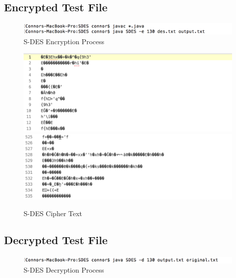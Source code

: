 \documentclass[]{article}
\begin{document}
\subsection*{Encrypted Test File}

\begin{figure}[H]
	\includegraphics[width=\textwidth]{sdes_encrypt.png}
	\caption{S-DES Encryption Process}
	\centering
\end{figure}

\begin{figure}[H]
	\includegraphics[width=\textwidth]{sdes_cipher1.png}
	\includegraphics[width=\textwidth]{sdes_cipher2.png}	
	\caption{S-DES Cipher Text}
	\centering
\end{figure}

\subsection*{Decrypted Test File}

\begin{figure}[H]
	\includegraphics[width=\textwidth]{sdes_decrypt.png}
	\caption{S-DES Decryption Process}
	\centering
\end{figure}
\end{document}
